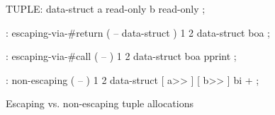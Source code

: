 \centering

  \begin{factorcode}
    TUPLE: data-struct
      { a read-only }
      { b read-only } ;

    : escaping-via-#return ( -- data-struct )
      1 2 data-struct boa ;

    : escaping-via-#call ( -- )
      1 2 data-struct boa pprint ;

    : non-escaping ( -- )
      1 2 data-struct [ a>> ] [ b>> ] bi + ;
  \end{factorcode}

\caption{Escaping vs. non-escaping tuple allocations}
